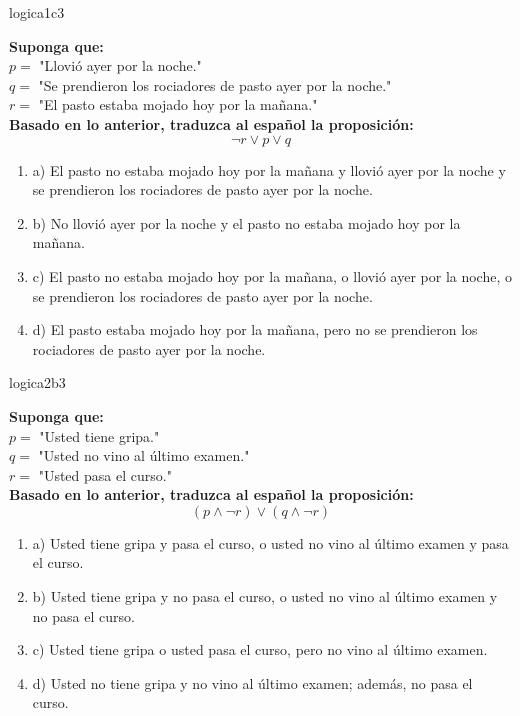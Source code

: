 \documentclass{article}
\begin{document}
\begin{question}{5}{logica}{1}{c}{3}{
\textbf{Suponga que:}\\
\(p =\) "Llovió ayer por la noche."\\
\(q =\) "Se prendieron los rociadores de pasto ayer por la noche."\\
\(r =\) "El pasto estaba mojado hoy por la mañana."\\
\textbf{Basado en lo anterior, traduzca al español la proposición:}\\
$$
\neg r \lor p \lor q
$$

\begin{enumerate}
    \item a) El pasto no estaba mojado hoy por la mañana y llovió ayer por la noche y se prendieron los rociadores de pasto ayer por la noche.
    \item b) No llovió ayer por la noche y el pasto no estaba mojado hoy por la mañana.
    \item c) El pasto no estaba mojado hoy por la mañana, o llovió ayer por la noche, o se prendieron los rociadores de pasto ayer por la noche.
    \item d) El pasto estaba mojado hoy por la mañana, pero no se prendieron los rociadores de pasto ayer por la noche.
\end{enumerate}
}
\end{question}

\begin{question}{6}{logica}{2}{b}{3}{
\textbf{Suponga que:}\\
\(p =\) "Usted tiene gripa."\\
\(q =\) "Usted no vino al último examen."\\
\(r =\) "Usted pasa el curso."\\
\textbf{Basado en lo anterior, traduzca al español la proposición:}\\
$$
(p \land \neg r)\lor (q \land \neg r)
$$

\begin{enumerate}
    \item a) Usted tiene gripa y pasa el curso, o usted no vino al último examen y pasa el curso.
    \item b) Usted tiene gripa y no pasa el curso, o usted no vino al último examen y no pasa el curso.
    \item c) Usted tiene gripa o usted pasa el curso, pero no vino al último examen.
    \item d) Usted no tiene gripa y no vino al último examen; además, no pasa el curso.
\end{enumerate}
}
\end{question}
\end{document}
